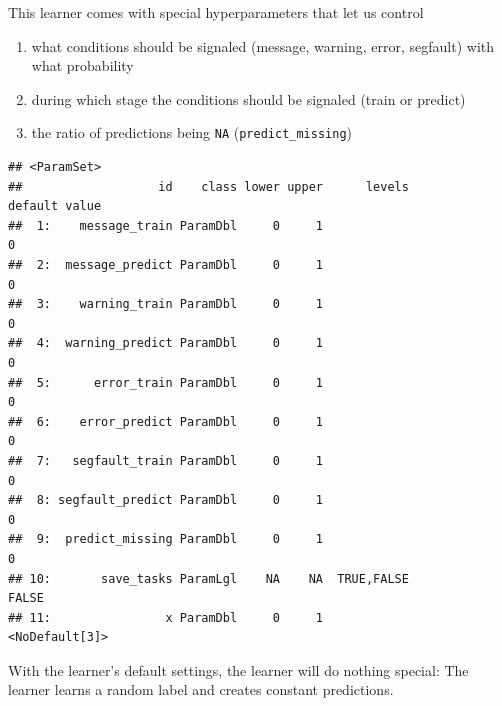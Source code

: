 \documentclass[]{scrbook}
\newenvironment{Shaded}{\begin{snugshade}}{\end{snugshade}}
\newcommand{\KeywordTok}[1]{\textcolor[rgb]{0.13,0.29,0.53}{\textbf{#1}}}
\newcommand{\NormalTok}[1]{#1}
\newcommand{\OperatorTok}[1]{\textcolor[rgb]{0.81,0.36,0.00}{\textbf{#1}}}
\newcommand{\StringTok}[1]{\textcolor[rgb]{0.31,0.60,0.02}{#1}}
\providecommand{\tightlist}{%
  \setlength{\itemsep}{0pt}\setlength{\parskip}{0pt}}
\renewenvironment{Shaded} {\begin{snugshade}\small} {\end{snugshade}}
\begin{document}
This learner comes with special hyperparameters that let us control

\begin{enumerate}
\def\labelenumi{\arabic{enumi}.}
\tightlist
\item
  what conditions should be signaled (message, warning, error, segfault) with what probability
\item
  during which stage the conditions should be signaled (train or predict)
\item
  the ratio of predictions being \texttt{NA} (\texttt{predict\_missing})
\end{enumerate}

\begin{Shaded}
\end{Shaded}

\begin{verbatim}
## <ParamSet>
##                   id    class lower upper      levels        default value
##  1:    message_train ParamDbl     0     1                          0      
##  2:  message_predict ParamDbl     0     1                          0      
##  3:    warning_train ParamDbl     0     1                          0      
##  4:  warning_predict ParamDbl     0     1                          0      
##  5:      error_train ParamDbl     0     1                          0      
##  6:    error_predict ParamDbl     0     1                          0      
##  7:   segfault_train ParamDbl     0     1                          0      
##  8: segfault_predict ParamDbl     0     1                          0      
##  9:  predict_missing ParamDbl     0     1                          0      
## 10:       save_tasks ParamLgl    NA    NA  TRUE,FALSE          FALSE      
## 11:                x ParamDbl     0     1             <NoDefault[3]>
\end{verbatim}

With the learner's default settings, the learner will do nothing special: The learner learns a random label and creates constant predictions.

\begin{Shaded}
\end{Shaded}
\end{document}
